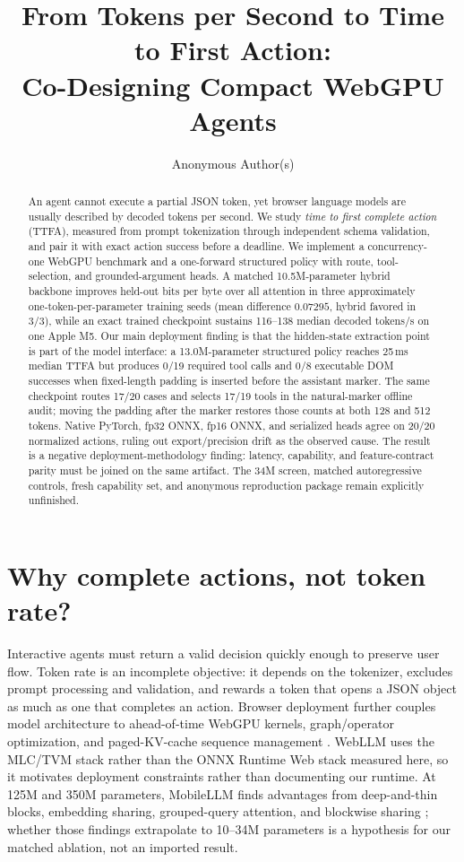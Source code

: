 \documentclass{article}
\title{From Tokens per Second to Time to First Action:\\
Co-Designing Compact WebGPU Agents}
\author{Anonymous Author(s)}
\begin{document}
\maketitle

\begin{abstract}
An agent cannot execute a partial JSON token, yet browser language models are usually described
by decoded tokens per second.  We study \emph{time to first complete action} (TTFA), measured from
prompt tokenization through independent schema validation, and pair it with exact action success
before a deadline.  We implement a concurrency-one WebGPU benchmark and a one-forward structured
policy with route, tool-selection, and grounded-argument heads.  A matched 10.5M-parameter hybrid
backbone improves held-out bits per byte over all attention in three approximately
one-token-per-parameter training seeds (mean difference \(0.07295\), hybrid favored in 3/3), while
an exact trained checkpoint sustains 116--138 median decoded tokens/s on one Apple M5.  Our main
deployment finding is that the hidden-state extraction point is part of the model interface: a
13.0M-parameter structured policy reaches 25\,ms median TTFA but produces 0/19 required tool calls
and 0/8 executable DOM successes when fixed-length padding is inserted before the assistant
marker.  The same checkpoint routes 17/20 cases and selects 17/19 tools in the natural-marker
offline audit; moving the padding after the marker restores those counts at both 128 and 512
tokens.  Native PyTorch, fp32 ONNX, fp16 ONNX, and serialized heads agree on 20/20 normalized
actions, ruling out export/precision drift as the observed cause.  The result is a negative
deployment-methodology finding: latency, capability, and feature-contract parity must be joined on
the same artifact.  The 34M screen, matched autoregressive controls, fresh capability set, and
anonymous reproduction package remain explicitly unfinished.
\end{abstract}

\section{Why complete actions, not token rate?}

Interactive agents must return a valid decision quickly enough to preserve user flow.  Token rate
is an incomplete objective: it depends on the tokenizer, excludes prompt processing and
validation, and rewards a token that opens a JSON object as much as one that completes an action.
Browser deployment further couples model architecture to ahead-of-time WebGPU kernels,
graph/operator optimization, and paged-KV-cache sequence management \citep{ruan2026webllm}.
WebLLM uses the MLC/TVM stack rather than the ONNX Runtime Web stack measured here, so it motivates
deployment constraints rather than documenting our runtime.  At 125M and 350M parameters,
MobileLLM finds advantages from deep-and-thin blocks, embedding sharing, grouped-query attention,
and blockwise sharing \citep{liu2024mobilellm}; whether those findings extrapolate to 10--34M
parameters is a hypothesis for our matched ablation, not an imported result.
\end{document}
